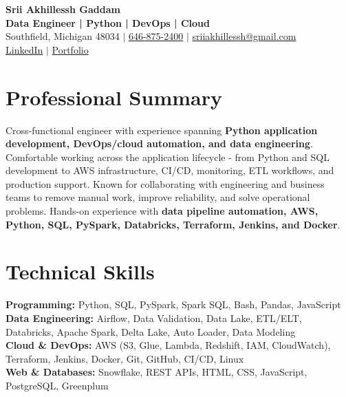 \documentclass[letterpaper,10pt]{article}
\begin{document}
\fontsize{9.35pt}{10.45pt}\selectfont

\begin{center}
    {\LARGE \textbf{Srii Akhillessh Gaddam}} \\[-1pt]
    \textbf{Data Engineer | Python | DevOps | Cloud} \\[2pt]
    Southfield, Michigan 48034 $|$
    \href{tel:6468752400}{646-875-2400} $|$
    \href{mailto:sriiakhillessh@gmail.com}{sriiakhillessh@gmail.com} \\[1pt]
    \href{https://www.linkedin.com/in/srii-akhiilessh-gaddam-b48668191/}{LinkedIn} $|$
    \href{https://sriiakhillesshg.github.io/portfolio/}{Portfolio}
\end{center}
\vspace{-8pt}

\section{Professional Summary}
\small{Cross-functional engineer with experience spanning \textbf{Python application development, DevOps/cloud automation, and data engineering}. Comfortable working across the application lifecycle - from Python and SQL development to AWS infrastructure, CI/CD, monitoring, ETL workflows, and production support. Known for collaborating with engineering and business teams to remove manual work, improve reliability, and solve operational problems. Hands-on experience with \textbf{data pipeline automation, AWS, Python, SQL, PySpark, Databricks, Terraform, Jenkins, and Docker}.}

\section{Technical Skills}
\small{
\textbf{Programming:} Python, SQL, PySpark, Spark SQL, Bash, Pandas, JavaScript \\
\textbf{Data Engineering:} Airflow, Data Validation, Data Lake, ETL/ELT, Databricks, Apache Spark, Delta Lake, Auto Loader, Data Modeling \\
\textbf{Cloud \& DevOps:} AWS (S3, Glue, Lambda, Redshift, IAM, CloudWatch), Terraform, Jenkins, Docker, Git, GitHub, CI/CD, Linux \\
\textbf{Web \& Databases:} Snowflake, REST APIs, HTML, CSS, JavaScript, PostgreSQL, Greenplum
}
\end{document}
